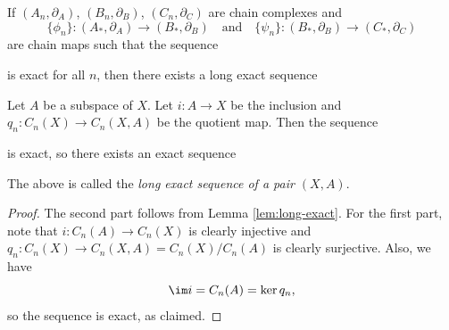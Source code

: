 \begin{lemma}\label{lem:long-exact}
  If $(A_n, \partial_A)$, $(B_n, \partial_B)$, $(C_n, \partial_C)$ are chain complexes and
  \[
    \{\phi_n\} : (A_*, \partial_A) \to (B_*, \partial_B)
    \quad \text{and} \quad
    \{\psi_n\} : (B_*, \partial_B) \to (C_*, \partial_C)
  \]
  are chain maps such that the sequence
  \begin{center}
  \end{center}
  is exact for all $n$, then there exists a
  long exact sequence
  \begin{center}
  \end{center}
\end{lemma}

\begin{corollary}
  Let $A$ be a subspace of $X$.
  Let $i : A \to X$ be the inclusion and
  $q_n : C_n(X) \to C_n(X, A)$ be the quotient map.
  Then the sequence
  \begin{center}
  \end{center}
  is exact, so there exists an exact sequence
  \begin{center}
  \end{center}
  The above is called the \emph{long exact sequence of a pair $(X, A)$}.
\end{corollary}

\begin{proof}
  The second part follows from
  Lemma \ref{lem:long-exact}. For the first part,
  note that $i : C_n(A) \to C_n(X)$ is clearly
  injective and $q_n : C_n(X) \to C_n(X, A) = C_n(X) / C_n(A)$
  is clearly surjective. Also, we have
  \[
    \im i = C_n(A) = \ker q_n,
  \]
  so the sequence is exact, as claimed.
\end{proof}


